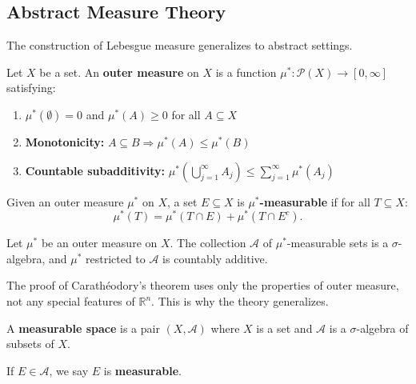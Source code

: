 \documentclass[11pt]{report}
\begin{document}
\subsection{Abstract Measure Theory}

The construction of Lebesgue measure generalizes to abstract settings.

\begin{defbox}
Let $X$ be a set. An \textbf{outer measure} on $X$ is a function $\mu^*: \mathcal{P}(X) \to [0, \infty]$ satisfying:
\begin{enumerate}
    \item $\mu^*(\emptyset) = 0$ and $\mu^*(A) \geq 0$ for all $A \subseteq X$
    \item \textbf{Monotonicity:} $A \subseteq B \Rightarrow \mu^*(A) \leq \mu^*(B)$
    \item \textbf{Countable subadditivity:} $\mu^*\left( \bigcup_{j=1}^{\infty} A_j \right) \leq \sum_{j=1}^{\infty} \mu^*(A_j)$
\end{enumerate}
\end{defbox}

\begin{defbox}
Given an outer measure $\mu^*$ on $X$, a set $E \subseteq X$ is \textbf{$\mu^*$-measurable} if for all $T \subseteq X$:
\[
\mu^*(T) = \mu^*(T \cap E) + \mu^*(T \cap E^c).
\]
\end{defbox}

\begin{thmbox}
Let $\mu^*$ be an outer measure on $X$. The collection $\mathcal{A}$ of $\mu^*$-measurable sets is a $\sigma$-algebra, and $\mu^*$ restricted to $\mathcal{A}$ is countably additive.
\end{thmbox}

\begin{rembox}
The proof of Carathéodory's theorem uses only the properties of outer measure, not any special features of $\mathbb{R}^n$. This is why the theory generalizes.
\end{rembox}

\begin{defbox}
A \textbf{measurable space} is a pair $(X, \mathcal{A})$ where $X$ is a set and $\mathcal{A}$ is a $\sigma$-algebra of subsets of $X$.

If $E \in \mathcal{A}$, we say $E$ is \textbf{measurable}.
\end{defbox}
\end{document}
